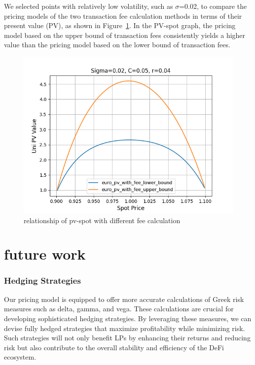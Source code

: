 \documentclass[conference]{IEEEtran}
\begin{document}
We selected points with relatively low volatility, such as $\sigma$=0.02, to compare the pricing models of the two transaction fee calculation methods in terms of their present value (PV), as shown in Figure~\ref{fig:different_fee_pv}. In the PV-spot graph, the pricing model based on the upper bound of transaction fees consistently yields a higher value than the pricing model based on the lower bound of transaction fees.


\begin{figure}
    \centering
    \includegraphics[width=1\linewidth]{figures/differentfee-pv.png}
    \caption{relationship of pv-spot with different fee calculation}
    \label{fig:different_fee_pv}
\end{figure}


\section{future work}
\subsubsection{Hedging Strategies}
Our pricing model is equipped to offer more accurate calculations of Greek risk measures such as delta, gamma, and vega. These calculations are crucial for developing sophisticated hedging strategies. By leveraging these measures, we can devise fully hedged strategies that maximize profitability while minimizing risk. Such strategies will not only benefit LPs by enhancing their returns and reducing risk but also contribute to the overall stability and efficiency of the DeFi ecosystem.
\end{document}
